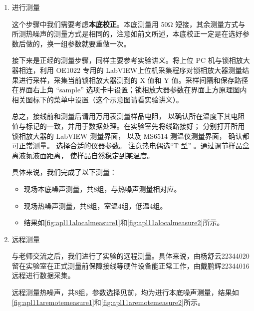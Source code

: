 \begin{enumerate}
\begin{ubox}{}
\begin{itemize}
			\item 远程测量：$\tau = 100ms$，$\text{Slope} = 5/64$，$\Delta t_{sample}=1s$，频率点见\cref{fig:apl11adatapack}。
		\end{itemize}
	\end{ubox}
	
	\item 进行测量
	
	这个步骤中我们需要考虑\textbf{本底校正}。本底测量用 50Ω 短接，其余测量方式与所测热噪声的测量方式是相同的，注意如前文所述，本底校正一定是在选好参数后做的，换一组参数就要重做一次。
	
	接下来是正经的测量步骤，同样主要参考实验讲义。将上位 PC 机与锁相放大器相连，利用 OE1022 专用的 LabVIEW上位机采集程序对锁相放大器测量结果进行采样，采集当前锁相放大器测到的 X 值和 Y 值。采样间隔和保存路径在界面右上角 “sample” 选项卡中设置；锁相放大器参数在界面上方原理图内相关图标下的菜单中设置（这个示意图请看实验讲义）。
	
	总之，接线前和测量后请用万用表测量样品电阻， 以确认所在温度下其电阻值与标记的一致，并用于数据处理。在实验室先将线路接好； 分别打开所用锁相放大器的 LabVIEW 测量界面， 以及 MS6514 测温仪测量界面， 确认都可正常测量。 选择合适的仪器参数。 注意热电偶选“T 型” 。通过调节样品盒离液氮液面距离， 使样品自然稳定到某温度。
	
	\begin{ubox}{}
		具体来说，我们完成了以下测量：
		\begin{itemize}
			\item 现场本底噪声测量，共8组，与热噪声测量相对应。
			
			\item 现场热噪声测量，共8组，室温4组，低温4组。
			
			\item 结果如\cref{fig:apl11alocalmeasure1}和\cref{fig:apl11alocalmeasure2}所示。
		\end{itemize}
	\end{ubox}
	
	\item 远程测量
	
	与老师交流之后，我们进行了实验的远程测量。具体来说，由杨舒云22344020留在实验室在正式测量前保障接线等硬件设备能正常工作，由戴鹏辉22344016远程进行数据采集。
	
	远程测量热噪声，共8组，参数选择见前，均为进行本底噪声测量，结果如\cref{fig:apl11aremotemeasure1}和\cref{fig:apl11aremotemeasure2}所示。
\end{enumerate}	

